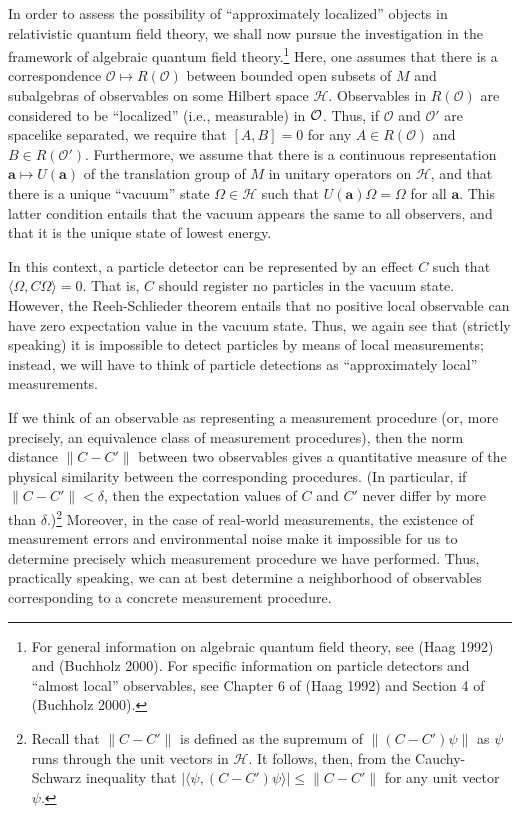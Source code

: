 \documentclass[12pt]{article}
\theoremstyle{remark}
\newcommand{\abs}[1]{\mbox{$|#1|$}}
\newcommand{\norm}[1]{\mbox{$\| #1\|$}}
\newcommand{\hil}[1]{\mathcal{#1}}
\begin{document}
In order to assess the possibility of ``approximately localized''
objects in relativistic quantum field theory, we shall now pursue the
investigation in the framework of algebraic quantum field
theory.\footnote{For general information on algebraic quantum field
  theory, see (Haag 1992) and (Buchholz 2000).  For specific
  information on particle detectors and ``almost local'' observables,
  see Chapter 6 of (Haag 1992) and Section 4 of (Buchholz 2000).}
Here, one assumes that there is a correspondence $\hil{O} \mapsto
R(\hil{O})$ between bounded open subsets of $M$ and subalgebras of
observables on some Hilbert space $\hil{H}$.  Observables in
$R(\hil{O})$ are considered to be ``localized'' (i.e., measurable) in
$\cal{O}$.  Thus, if $\mathcal{O}$ and $\mathcal{O}'$ are spacelike
separated, we require that $[A,B]=0$ for any $A\in R(\mathcal{O})$ and
$B\in R(\mathcal{O}')$.  Furthermore, we assume that there is a
continuous representation $\mathbf{a}\mapsto U(\mathbf{a})$ of the
translation group of $M$ in unitary operators on $\hil{H}$, and that
there is a unique ``vacuum'' state $\Omega \in \hil{H}$ such that
$U(\mathbf{a})\Omega =\Omega$ for all $\mathbf{a}$.  This latter
condition entails that the vacuum appears the same to all observers,
and that it is the unique state of lowest energy.

In this context, a particle detector can be represented by an effect
$C$ such that $\langle \Omega ,C\Omega \rangle =0$.  That is, $C$
should register no particles in the vacuum state.  However, the
Reeh-Schlieder theorem entails that no positive local observable can
have zero expectation value in the vacuum state.  Thus, we again see
that (strictly speaking) it is impossible to detect particles by means
of local measurements; instead, we will have to think of particle
detections as ``approximately local'' measurements.

If we think of an observable as representing a measurement procedure
(or, more precisely, an equivalence class of measurement procedures),
then the norm distance $\norm{C-C'}$ between two observables gives a
quantitative measure of the physical similarity between the
corresponding procedures.  (In particular, if $\norm{C-C'}<\delta$,
then the expectation values of $C$ and $C'$ never differ by more than
$\delta$.)\footnote{Recall that $\norm{C-C'}$ is defined as the
  supremum of $\norm{(C-C')\psi }$ as $\psi$ runs through the unit
  vectors in $\hil{H}$.  It follows, then, from the Cauchy-Schwarz
  inequality that $\abs{\langle \psi ,(C-C')\psi \rangle }\leq
  \norm{C-C'}$ for any unit vector $\psi$.}  Moreover, in the case of
real-world measurements, the existence of measurement errors and
environmental noise make it impossible for us to determine precisely
which measurement procedure we have performed.  Thus, practically
speaking, we can at best determine a neighborhood of observables
corresponding to a concrete measurement procedure.
\end{document}
